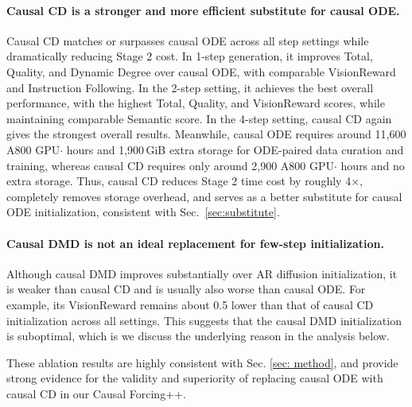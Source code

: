 \paragraph{Causal CD is a stronger and more efficient substitute for causal ODE.}
Causal CD matches or surpasses causal ODE across all step settings while dramatically reducing Stage 2 cost. In 1-step generation, it improves Total, Quality, and Dynamic Degree over causal ODE, with comparable VisionReward and Instruction Following. In the 2-step setting, it achieves the best overall performance, with the highest Total, Quality, and VisionReward scores, while maintaining comparable Semantic score. In the 4-step setting, causal CD again gives the strongest overall results. Meanwhile, causal ODE requires around 11,600 A800 GPU$\cdot$ hours and 1,900\,GiB extra storage for ODE-paired data curation and training, whereas causal CD requires only around 2,900 A800 GPU$\cdot$ hours and no extra storage. Thus, causal CD reduces Stage 2 time cost by roughly 4$\times$, completely removes storage overhead, and serves as a better substitute for causal ODE initialization, consistent with Sec.~\ref{sec:substitute}.

\paragraph{Causal DMD is not an ideal replacement for few-step initialization.} Although causal DMD improves substantially over AR diffusion initialization, it is weaker than causal CD and is usually also worse than causal ODE. For example, its VisionReward remains about 0.5 lower than that of causal CD initialization across all settings. This suggests that the causal DMD initialization is suboptimal, which is we discuss the underlying reason in the analysis below.

These ablation results are highly consistent with Sec. \ref{sec: method}, and provide strong evidence for the validity and superiority of replacing causal ODE with causal CD in our Causal Forcing++.



